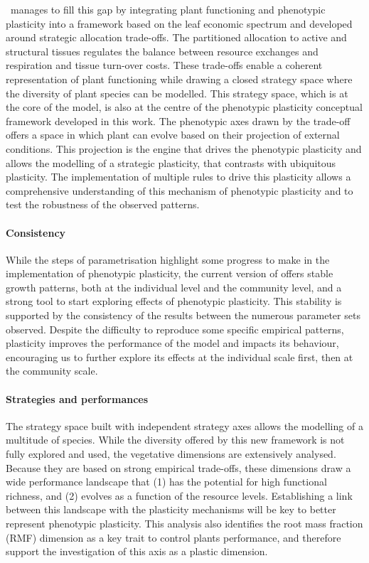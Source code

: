 \model ~manages to fill this gap by integrating plant functioning and phenotypic plasticity into a framework based on the leaf economic spectrum and developed around strategic allocation trade-offs. The partitioned allocation to active and structural tissues regulates the balance between resource exchanges and respiration and tissue turn-over costs. These trade-offs enable a coherent representation of plant functioning while drawing a closed strategy space where the diversity of plant species can be modelled. This strategy space, which is at the core of the model, is also at the centre of the phenotypic plasticity conceptual framework developed in this work. The phenotypic axes drawn by the trade-off offers a space in which plant can evolve based on their projection of external conditions. This projection is the engine that drives the phenotypic plasticity and allows the modelling of a strategic plasticity, that contrasts with ubiquitous plasticity. The implementation of multiple rules to drive this plasticity allows a comprehensive understanding of this mechanism of phenotypic plasticity and to test the robustness of the observed patterns.


\paragraph{Consistency}

While the steps of parametrisation highlight some progress to make in the implementation of phenotypic plasticity, the current version of \model offers stable growth patterns, both at the individual level and the community level, and a strong tool to start exploring effects of phenotypic plasticity. This stability is supported by the consistency of the results between the numerous parameter sets observed. Despite the difficulty to reproduce some specific empirical patterns, plasticity improves the performance of the model and impacts its behaviour, encouraging us to further explore its effects at the individual scale first, then at the community scale.

\paragraph{Strategies and performances}

The strategy space built with independent strategy axes allows the modelling of a multitude of species. While the diversity offered by this new framework is not fully explored and used, the vegetative dimensions are extensively analysed. Because they are based on strong empirical trade-offs, these dimensions draw a wide performance landscape that (1) has the potential for high functional richness, and (2) evolves as a function of the resource levels. Establishing a link between this landscape with the plasticity mechanisms will be key to better represent phenotypic plasticity. This analysis also identifies the root mass fraction (RMF) dimension as a key trait to control plants performance, and therefore support the investigation of this axis as a plastic dimension.


